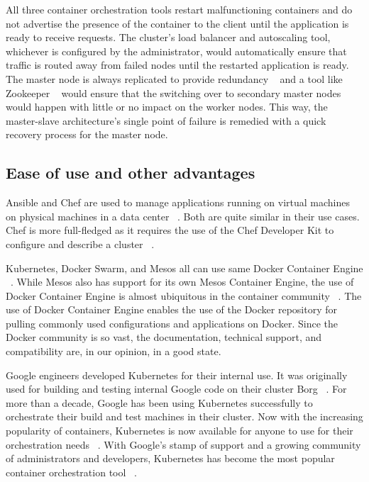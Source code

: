 \documentclass[10pt,twocolumn]{article}
\begin{document}
All three container orchestration tools restart malfunctioning containers and do not advertise the presence of the container to the client until the application is ready to receive requests.
The cluster's load balancer and autoscaling tool, whichever is configured by the administrator, would automatically ensure that traffic is routed away from failed nodes until the restarted application is ready.
The master node is always replicated to provide redundancy ~\cite{mesos, kubernetes} and a tool like Zookeeper ~\cite{zookeeper} would ensure that the switching over to secondary master nodes would happen with little or no impact on the worker nodes.
This way, the master-slave architecture's single point of failure is remedied with a quick recovery process for the master node.

\subsection{Ease of use and other advantages}

Ansible and Chef are used to manage applications running on virtual machines on physical machines in a data center ~\cite{ansible, chef}.
Both are quite similar in their use cases.
Chef is more full-fledged as it requires the use of the Chef Developer Kit to configure and describe a cluster ~\cite{chef}.

Kubernetes, Docker Swarm, and Mesos all can use same Docker Container Engine ~\cite{kubernetes, docker_swarm, mesos}.
While Mesos also has support for its own Mesos Container Engine, the use of Docker Container Engine is almost ubiquitous in the container community ~\cite{intro_docker}.
The use of Docker Container Engine enables the use of the Docker repository for pulling commonly used configurations and applications on Docker.
Since the Docker community is so vast, the documentation, technical support, and compatibility are, in our opinion, in a good state.

Google engineers developed Kubernetes for their internal use.
It was originally used for building and testing internal Google code on their cluster Borg ~\cite{kubernetes, borg}.
For more than a decade, Google has been using Kubernetes successfully to orchestrate their build and test machines in their cluster.
Now with the increasing popularity of containers, Kubernetes is now available for anyone to use for their orchestration needs ~\cite{kubernetes_github}.
With Google's stamp of support and a growing community of administrators and developers, Kubernetes has become the most popular container orchestration tool ~\cite{openhub}.
\end{document}
